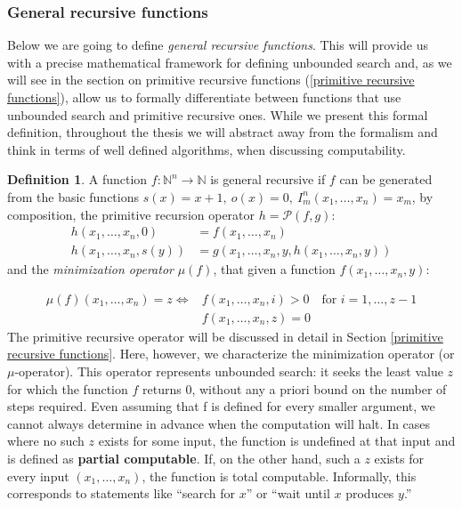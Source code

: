 \documentclass{pracalicmgr2025}
\theoremstyle{plain}            %
\theoremstyle{remark}           %
\theoremstyle{definition}       %
\newtheorem{definition}[theorem]{Definition}
\begin{document}
\subsubsection{General recursive functions}
 Below we are going to define \textit{general recursive functions}. This will provide us with a precise mathematical framework for defining unbounded search and, as we will see in the section on primitive recursive functions (\ref{primitive recursive functions}), allow us to formally differentiate between functions that use unbounded search and primitive recursive ones. While we present this formal definition, throughout the thesis we will abstract away from the formalism and think in terms of well defined algorithms, when discussing computability. 


\begin{definition} \label{general-recursive} A function $f:\mathbb{N}^n\to\mathbb{N}$ is general recursive if $f$ can be generated from the basic functions $s(x) = x + 1, \ o(x)=0, \ I^{n}_{m}(x_1, \dots,x_n) = x_m$, by composition, the primitive recursion operator $h = \mathcal{P}(f,g):$
\begin{align*}
h(x_1,\dots,x_n,0) &= f(x_1,\dots,x_n)\\
h(x_1,\dots,x_n,s(y)) &= g(x_1,\dots,x_n,y,h(x_1,\dots,x_n,y))
\end{align*}
and the \textit{minimization operator} $\mu(f)$, that given a function $f(x_1,\dots,x_n,y)$:

\begin{align}
\mu(f)(x_1,\dots,x_n) = z \iff &f(x_1,\dots,x_n,i) > 0 \quad \text{for } i = 1, \dots, z - 1 \\
                                &f(x_1,\dots,x_n,z) = 0 
\end{align}
The primitive recursive operator will be discussed in detail in Section \ref{primitive recursive functions}. Here, however, we characterize the minimization operator (or $\mu$-operator). This operator represents unbounded search: it seeks the least value $z$ for which the function $f$ returns $0$, without any a priori bound on the number of steps required. Even assuming that f is defined for every smaller argument, we cannot always determine in advance when the computation will halt. In cases where no such $z$ exists for some input, the function is undefined at that input and is defined as \textbf{partial computable}. If, on the other hand, such a $z$ exists for every input $(x_1, \dots, x_n)$, the function is total computable. Informally, this corresponds to statements like “search for $x$” or “wait until $x$ produces $y$.”
\end{definition}
\end{document}
